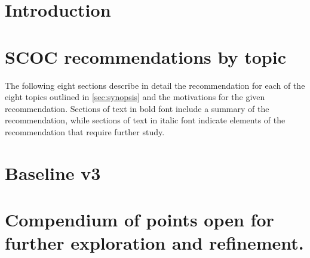 \section{Introduction}




%
\clearpage

\section{SCOC recommendations by topic}\label{sec:rec}
The following eight sections describe in detail the recommendation for each of the eight topics outlined in \autoref{sec:synopsis} and the motivations for the given recommendation. Sections of text in bold font include a summary of the recommendation, while sections of text in italic font indicate elements of the recommendation that require further study. 


\clearpage

\section{Baseline v3}\label{sec:v3}

\clearpage

\section{Compendium of points open for further exploration and refinement.}
\label{sec:refinements}
\clearpage




